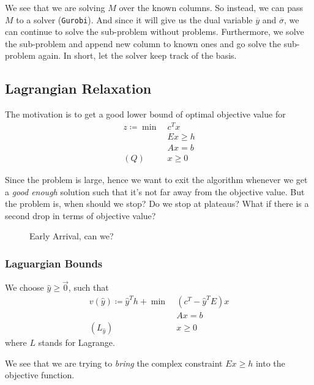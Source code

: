 \begin{prev}
\begin{remark}
		\begin{note}
			We see that we are solving \(M\) over the known columns. So instead, we can pass \(M\) to a solver (\texttt{Gurobi}). And since
			it will give us the dual variable \(\overline{y}\) and \(\overline{\sigma}\), we can continue to solve the sub-problem without problems.
			Furthermore, we solve the sub-problem and append new column to known ones and go solve the sub-problem again. In short, let the solver
			keep track of the basis.
		\end{note}
	\end{remark}
\end{prev}

\subsection{Lagrangian Relaxation}
The motivation is to get a good lower bound of optimal objective value for
\begin{align*}
	z\coloneqq \min~ & c^{T}x    \\
	                 & Ex \geq h \\
	                 & Ax = b    \\
	(Q)\quad         & x\geq 0
\end{align*}

Since the problem is large, hence we want to exit the algorithm whenever we get a \emph{good enough} solution such that it's not far away from the objective
value. But the problem is, when should we stop? Do we stop at plateaus? What if there is a second drop in terms of objective value?

\begin{figure}[H]
	\centering
	\caption{Early Arrival, can we?}
	\label{fig:plateau}
\end{figure}

\subsubsection{Laguargian Bounds}
We choose \(\hat{y}\geq \vec{0}\), such that
\begin{align*}
	v(\hat{y})\coloneqq \hat{y}^{T}h + \min~ & (c^{T} - \hat{y}^{T}E)x \\
	                                         & Ax = b                  \\
	(L_{\hat{y}})\quad                       & x\geq 0
\end{align*}
where \(L\) stands for Lagrange.
\begin{intuition}
	We see that we are trying to \emph{bring} the complex constraint \(Ex\geq h\) into the objective function.
\end{intuition}

